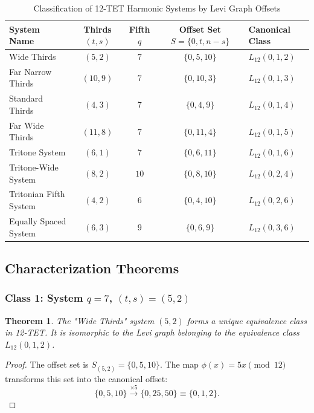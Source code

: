 \documentclass[12pt,letterpaper]{amsart}
\newtheorem{theorem}{Theorem}
\begin{document}
\begin{table}[H]
\centering
\begin{tabular}{|l|c|c|c|l|}
\hline
\textbf{System Name} & \textbf{Thirds} $(t, s)$ & \textbf{Fifth} $q$ & \textbf{Offset Set} $S=\{0, t, n-s\}$ & \textbf{Canonical Class} \\
\hline
Wide Thirds & $(5, 2)$ & $7$ & $\{0, 5, 10\}$ & $L_{12}(0,1,2)$ \\
Far Narrow Thirds & $(10, 9)$ & $7$ & $\{0, 10, 3\}$ & $L_{12}(0,1,3)$ \\
Standard Thirds & $(4, 3)$ & $7$ & $\{0, 4, 9\}$ & $L_{12}(0,1,4)$ \\
Far Wide Thirds & $(11, 8)$ & $7$ & $\{0, 11, 4\}$ & $L_{12}(0,1,5)$ \\
Tritone System & $(6, 1)$ & $7$ & $\{0, 6, 11\}$ & $L_{12}(0,1,6)$ \\
Tritone-Wide System & $(8, 2)$ & $10$ & $\{0, 8, 10\}$ & $L_{12}(0,2,4)$ \\
Tritonian Fifth System & $(4, 2)$ & $6$ & $\{0, 4, 10\}$ & $L_{12}(0,2,6)$ \\
Equally Spaced System & $(6, 3)$ & $9$ & $\{0, 6, 9\}$ & $L_{12}(0,3,6)$ \\
\hline
\end{tabular}
\caption{Classification of 12-TET Harmonic Systems by Levi Graph Offsets}
\label{tab:12tet_systems_classification}
\end{table}

\subsection{Characterization Theorems}

\subsubsection{Class 1: System $q=7$, $(t,s)=(5,2)$}

\begin{theorem}
The "Wide Thirds" system $(5,2)$ forms a unique equivalence class in 12-TET. It is isomorphic to the Levi graph belonging to the equivalence class $L_{12}(0,1,2)$.
\end{theorem}

\begin{proof}
The offset set is $S_{(5,2)} = \{0, 5, 10\}$. The map $\phi(x) = 5x \pmod{12}$ transforms this set into the canonical offset:
\[ \{0, 5, 10\} \xrightarrow{\times 5} \{0, 25, 50\} \equiv \{0, 1, 2\}. \]
\end{proof}
\end{document}
